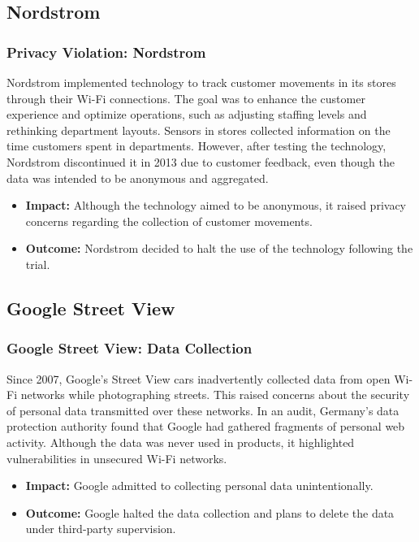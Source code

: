 \documentclass[
english,
svgnames,
notes=hide,
12pt]{beamer}
\begin{document}
\begin{frame}
  \section{Nordstrom}
  \frametitle{Privacy Violation: Nordstrom}
  Nordstrom implemented technology to track customer movements in its stores through their Wi-Fi connections. 
  The goal was to enhance the customer experience and optimize operations, such as adjusting staffing levels 
  and rethinking department layouts. Sensors in stores collected information on the time customers spent in 
  departments. However, after testing the technology, Nordstrom discontinued it in 2013 due to customer 
  feedback, even though the data was intended to be anonymous and aggregated.
  \begin{itemize}
    \item \textbf{Impact:} Although the technology aimed to be anonymous, it raised privacy concerns regarding 
      the collection of customer movements. \pause
    \item \textbf{Outcome:} Nordstrom decided to halt the use of the technology following the trial. 
  \end{itemize}
\end{frame}

\begin{frame}
  \section{Google Street View}
  \frametitle{Google Street View: Data Collection}
  Since 2007, Google's Street View cars inadvertently collected data from open Wi-Fi networks while 
  photographing streets. This raised concerns about the security of personal data transmitted over 
  these networks. In an audit, Germany's data protection authority found that Google had gathered 
  fragments of personal web activity. Although the data was never used in products, it highlighted 
  vulnerabilities in unsecured Wi-Fi networks.
  \begin{itemize}
    \item \textbf{Impact:} Google admitted to collecting personal data unintentionally. \pause
    \item \textbf{Outcome:} Google halted the data collection and plans to delete the data under third-party supervision. 
  \end{itemize}
\end{frame}
\end{document}
